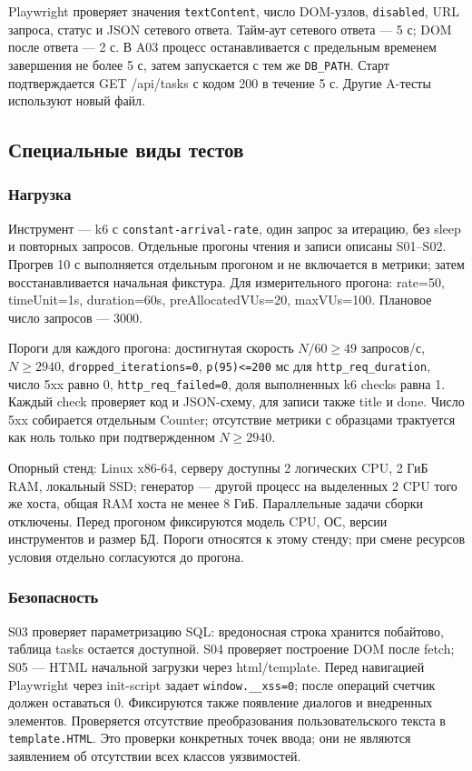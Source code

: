 \documentclass[12pt,a4paper]{extarticle}
\newcommand{\code}[1]{\nolinkurl{#1}}
\begin{document}
Playwright проверяет значения \code{textContent}, число DOM-узлов,
\code{disabled}, URL запроса, статус и JSON сетевого ответа.
Тайм-аут сетевого ответа --- 5 с; DOM после ответа --- 2 с.
В A03 процесс останавливается с предельным временем завершения не более 5 с,
затем запускается с тем же \code{DB_PATH}. Старт подтверждается GET /api/tasks
с кодом 200 в течение 5 с. Другие A-тесты используют новый файл.

\subsection{Специальные виды тестов}
\subsubsection{Нагрузка}
Инструмент --- k6 с \code{constant-arrival-rate}, один запрос за итерацию,
без sleep и повторных запросов. Отдельные прогоны чтения и записи
описаны S01--S02. Прогрев 10 с выполняется отдельным прогоном и не
включается в метрики; затем восстанавливается начальная фикстура.
Для измерительного прогона: rate=50, timeUnit=1s, duration=60s,
preAllocatedVUs=20, maxVUs=100. Плановое число запросов --- 3000.

Пороги для каждого прогона: достигнутая скорость $N/60\geq49$ запросов/с,
$N\geq2940$, \code{dropped_iterations=0},
\code{p(95)<=200} мс для \code{http_req_duration}, число 5xx равно 0,
\code{http_req_failed=0}, доля выполненных k6 checks равна 1.
Каждый check проверяет код и JSON-схему, для записи также title и done.
Число 5xx собирается отдельным Counter; отсутствие метрики с образцами
трактуется как ноль только при подтвержденном $N\geq2940$.

Опорный стенд: Linux x86-64, серверу доступны 2 логических CPU,
2 ГиБ RAM, локальный SSD; генератор --- другой процесс на выделенных
2 CPU того же хоста, общая RAM хоста не менее 8 ГиБ. Параллельные
задачи сборки отключены. Перед прогоном фиксируются модель CPU,
ОС, версии инструментов и размер БД. Пороги относятся к этому стенду;
при смене ресурсов условия отдельно согласуются до прогона.

\subsubsection{Безопасность}
S03 проверяет параметризацию SQL: вредоносная строка хранится
побайтово, таблица tasks остается доступной. S04 проверяет
построение DOM после fetch; S05 --- HTML начальной загрузки через
html/template. Перед навигацией Playwright через init-script
задает \code{window.__xss=0}; после операций счетчик должен оставаться 0.
Фиксируются также появление диалогов и внедренных элементов.
Проверяется отсутствие преобразования пользовательского текста в
\code{template.HTML}. Это проверки конкретных точек ввода;
они не являются заявлением об отсутствии всех классов уязвимостей.
\end{document}
